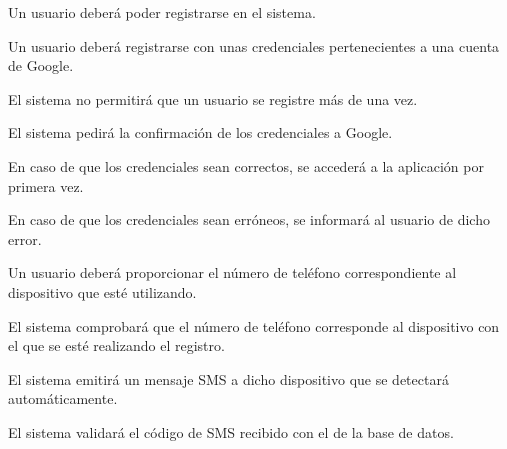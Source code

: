 



\begin{myEnumerate}
  \item Un usuario deberá poder registrarse en el sistema.\label{req_registro} %
  \begin{myEnumerate}
    
    \item Un usuario deberá registrarse con unas credenciales pertenecientes a una cuenta de Google.
    \begin{myEnumerate}
      \item El sistema no permitirá que un usuario se registre más de una vez.
      \item El sistema pedirá la confirmación de los credenciales a Google.
      \begin{myEnumerate}
      	\item En caso de que los credenciales sean correctos, se accederá a la aplicación por primera vez.
      	\item En caso de que los credenciales sean erróneos, se informará al usuario de dicho error.
       \end{myEnumerate}
    \end{myEnumerate}
    
    \item Un usuario deberá proporcionar el número de teléfono correspondiente al dispositivo que esté utilizando.
    \begin{myEnumerate}
    	\item El sistema comprobará que el número de teléfono corresponde al dispositivo con el que se esté realizando el registro.
    	\begin{myEnumerate}
     		\item El sistema emitirá un mensaje SMS a dicho dispositivo que se detectará automáticamente.
      		\item El sistema validará el código de SMS recibido con el de la base de datos.
    	\end{myEnumerate}
   	\end{myEnumerate} 
   	

\end{myEnumerate}
\end{myEnumerate}
